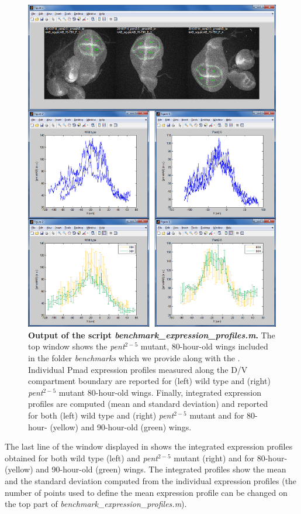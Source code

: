 \begin{figure}[!h]
\centering
\includegraphics[scale=0.35]{images/matlab_expression_1D.jpg}
\caption{\textbf{Output of the \wingj \matlab script \textit{benchmark\_expression\_profiles.m}.} The top window shows the \textit{pent$^{2-5}$} mutant, 80-hour-old wings included in the folder \textit{benchmarks} which we provide along with the \wingjMatlab. Individual Pmad expression profiles measured along the D/V compartment boundary are reported for (left) wild type and (right) \textit{pent$^{2-5}$} mutant 80-hour-old wings. Finally, integrated expression profiles are computed (mean and standard deviation) and reported for both (left) wild type and (right) \textit{pent$^{2-5}$} mutant and for 80-hour- (yellow) and 90-hour-old (green) wings.}
\label{fig:matlab_expression_1D}
\end{figure}

The last line of the window displayed in  shows the integrated expression profiles obtained for both wild type (left) and \textit{pent$^{2-5}$} mutant (right) and for 80-hour- (yellow) and 90-hour-old (green) wings. The integrated profiles show the mean and the standard deviation computed from the individual expression profiles (the number of points used to define the mean expression profile can be changed on the top part of \textit{benchmark\_expression\_profiles.m}).\\

